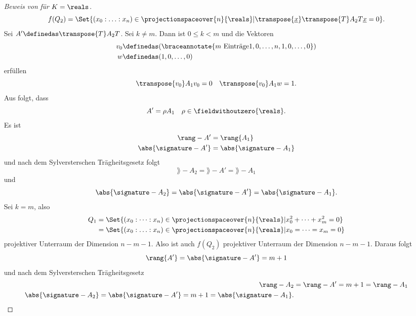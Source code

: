 \begin{proof}[Beweis von  für \( K=\reals \)]
\begin{equation*}
    f(Q_2)=\Set{(x_0:\dotsc:x_n)\in \projectionspaceover{n}{\reals}|\transpose{\underline{x}}\transpose{T}A_2T \underline{x}=0}.
  \end{equation*}
  Sei \( A'\definedas \transpose{T}A_2 T \). Sei \( k\neq m \). Dann ist \( 0\leq k<m \) und die Vektoren
  \begin{align*}
    v_0&\definedas (\braceannotate{m \text{ Einträge}{1,0,\dotsc,n},1,0,\dotsc,0})\\
    w&\definedas(1,0,\dotsc,0)
  \end{align*}
  erfüllen
  \begin{equation*}
    \transpose{v_0}A_1 v_0=0\quad \transpose{v_0}A_1 w=1.
  \end{equation*}
  Aus  folgt, dass
  \begin{equation*}
    A'=\rho A_1\quad \rho\in \fieldwithoutzero{\reals}.
  \end{equation*}
  Es ist
  \begin{align*}
    \rang-{A'}&=\rang{A_1}\\
    \abs{\signature-{A'}}&=\abs{\signature-{A_1}}
  \end{align*}
  und nach dem Sylversterschen Trägheitsgesetz folgt
  \begin{equation*}
    \rang-{A_2}=\rang-{A'}=\rang-{A_1}
  \end{equation*}
  und
  \begin{equation*}
    \abs{\signature-{A_2}}=\abs{\signature-{A'}}=\abs{\signature-{A_1}}.
  \end{equation*}
  Sei \( k=m \), also
  \begin{align*}
    Q_1&=\Set{(x_0:\dotsb:x_n)\in \projectionspaceover{n}{\reals}|x_0^2+\dotsb+x_m^2=0}\\
    &=\Set{(x_0:\dotsc:x_n)\in \projectionspaceover{n}{\reals}|x_0=\dotsb=x_m=0}
  \end{align*}
  projektiver Unterraum der Dimension \( n-m-1 \). Also ist auch \( f(Q_2) \) projektiver Unterraum der Dimension \( n-m-1 \). Daraus folgt
  \begin{equation*}
    \rang{A'}=\abs{\signature-{A'}}=m+1
  \end{equation*}
  und nach dem Sylversterschen Trägheitsgesetz
  \begin{align*}
    \rang-{A_2}&=\rang-{A'}=m+1=\rang-{A_1}\\
    \abs{\signature-{A_2}}=\abs{\signature-{A'}}=m+1=\abs{\signature-{A_1}}.
  \end{align*}
\end{proof}
